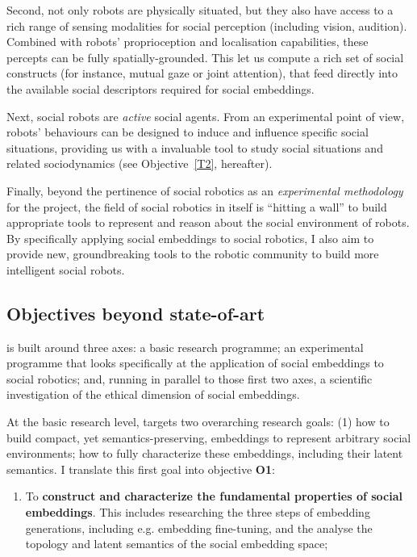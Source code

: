 Second, not only robots are physically situated, but they also have access to a rich
range of sensing modalities for social perception (including vision, audition).
Combined with robots' proprioception and localisation capabilities, these
percepts can be fully spatially-grounded. This let us compute a rich set of
social constructs (for instance, mutual gaze or joint attention), that feed
directly into the available social descriptors required for social embeddings.

Next, social robots are \emph{active} social agents. From an experimental point
of view, robots' behaviours can be
designed to induce and influence specific social situations, providing us with a
invaluable tool to study social situations and related sociodynamics (see
Objective~\ref{T2}, hereafter).

Finally, beyond the pertinence of social robotics as an \emph{experimental
methodology} for the \project project, the field of social robotics in itself is
``hitting a wall''  to build appropriate tools to represent and
reason about the social environment of robots. By specifically applying social
embeddings to social robotics, I also aim to provide new, groundbreaking
tools to the robotic community to build more intelligent social robots.

\subsection{Objectives beyond state-of-art}

\project is built around three axes: a basic research programme; an experimental
programme that looks specifically at the application of social embeddings to
social robotics; and, running in parallel to those first two axes, a scientific
investigation of the ethical dimension of social embeddings.

At the basic research level, \project targets two overarching research goals:
(1) how to build compact, yet semantics-preserving, embeddings to represent
arbitrary social environments; how to fully characterize these embeddings,
including their latent semantics. I translate this first goal into objective
{\bf O1}:

\begin{enumerate}[label=\textbf{O\arabic*}]
    \item \label{T1} To \textbf{construct and characterize the fundamental
        properties of social embeddings}. This includes researching the three
        steps of embedding generations, including e.g. embedding fine-tuning,
        and the analyse the topology and latent semantics of the social
        embedding space;
\end{enumerate}

